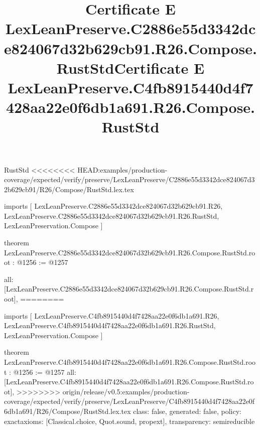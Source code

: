 \begin{lexlean}{RustStd}
<<<<<<<< HEAD:examples/production-coverage/expected/verify/preserve/LexLeanPreserve/C2886e55d3342dce824067d32b629cb91/R26/Compose/RustStd.lex.tex
\title{Certificate E LexLeanPreserve.C2886e55d3342dce824067d32b629cb91.R26.Compose.RustStd}
\begin{coremodule}
imports [
  LexLeanPreserve.C2886e55d3342dce824067d32b629cb91.R26,
  LexLeanPreserve.C2886e55d3342dce824067d32b629cb91.R26.RustStd,
  LexLeanPreservation.Compose
]

theorem LexLeanPreserve.C2886e55d3342dce824067d32b629cb91.R26.Compose.RustStd.root : @1256 := @1257 {
  all: [LexLeanPreserve.C2886e55d3342dce824067d32b629cb91.R26.Compose.RustStd.root],
========
\title{Certificate E LexLeanPreserve.C4fb8915440d4f7428aa22e0f6db1a691.R26.Compose.RustStd}
\begin{coremodule}
imports [
  LexLeanPreserve.C4fb8915440d4f7428aa22e0f6db1a691.R26,
  LexLeanPreserve.C4fb8915440d4f7428aa22e0f6db1a691.R26.RustStd,
  LexLeanPreservation.Compose
]

theorem LexLeanPreserve.C4fb8915440d4f7428aa22e0f6db1a691.R26.Compose.RustStd.root : @1256 := @1257 {
  all: [LexLeanPreserve.C4fb8915440d4f7428aa22e0f6db1a691.R26.Compose.RustStd.root],
>>>>>>>> origin/release/v0.5:examples/production-coverage/expected/verify/preserve/LexLeanPreserve/C4fb8915440d4f7428aa22e0f6db1a691/R26/Compose/RustStd.lex.tex
  class: false,
  generated: false,
  policy: exact{axioms: [Classical.choice, Quot.sound, propext]},
  transparency: semireducible
}


\end{coremodule}}
\end{coremodule}
\end{lexlean}
